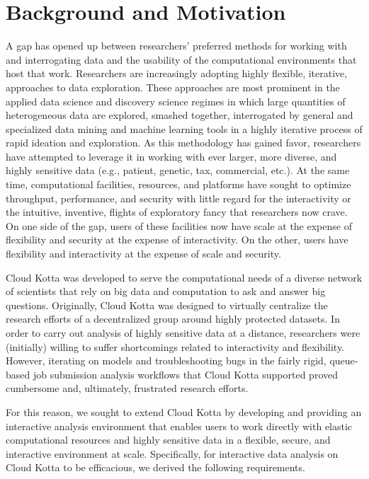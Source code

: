 \section{Background and Motivation}

A gap has opened up between researchers' preferred methods for working with and interrogating data and the usability of the computational environments that host that work. Researchers are increasingly adopting highly flexible, iterative, approaches to data exploration. These approaches are most prominent in the applied data science and discovery science regimes in which large quantities of heterogeneous data are explored, smashed together, interrogated by general and specialized data mining and machine learning tools in a highly iterative process of rapid ideation and exploration. As this methodology has gained favor, researchers have attempted to leverage it in working with ever larger, more diverse, and highly sensitive data (e.g., patient, genetic, tax, commercial, etc.). At the same time, computational facilities, resources, and platforms have sought to optimize throughput, performance, and security with little regard for the interactivity or the intuitive, inventive, flights of exploratory fancy that researchers now crave. On one side of the gap, users of these facilities now have scale at the expense of flexibility and security at the expense of interactivity. On the other, users have flexibility and interactivity at the expense of scale and security.

Cloud Kotta was developed to serve the computational needs of a diverse network of scientists that rely on big data and computation to ask and answer big questions. Originally, Cloud Kotta was designed to virtually centralize the research efforts of a decentralized group around highly protected datasets. In order to carry out analysis of highly sensitive data at a distance, researchers were (initially) willing to suffer shortcomings related to interactivity and flexibility. However, iterating on models and troubleshooting bugs in the fairly rigid, queue-based job submission analysis workflows that Cloud Kotta supported proved cumbersome and, ultimately, frustrated research efforts.

For this reason, we sought to extend Cloud Kotta by developing and providing an interactive analysis environment that enables users to work directly with elastic computational resources and highly sensitive data in a flexible, secure, and interactive environment at scale. Specifically, for interactive data analysis on Cloud Kotta to be efficacious, we derived the following requirements.

